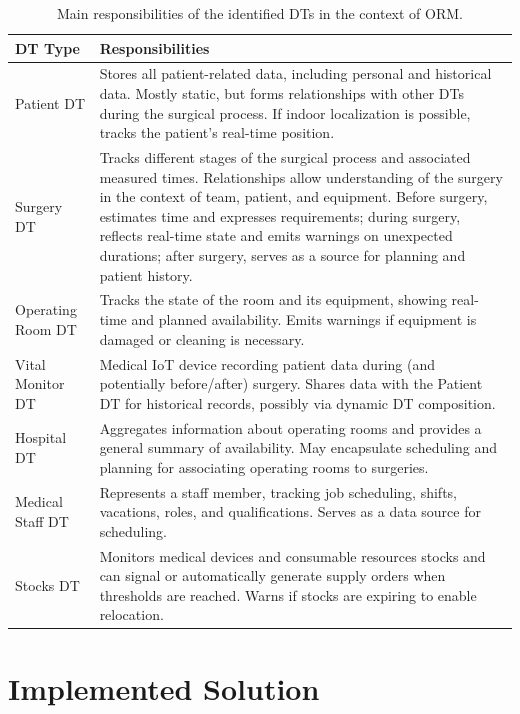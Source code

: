 \begin{table}
\centering
\small
\begin{tabularx}{\textwidth}{|p{3cm}|X|}
\hline
\textbf{DT Type} & \textbf{Responsibilities} \\
\hline
Patient DT & Stores all patient-related data, including personal and historical data. Mostly static, but forms relationships with other DTs during the surgical process. If indoor localization is possible, tracks the patient's real-time position. \\
\hline
Surgery DT & Tracks different stages of the surgical process and associated measured times. Relationships allow understanding of the surgery in the context of team, patient, and equipment. Before surgery, estimates time and expresses requirements; during surgery, reflects real-time state and emits warnings on unexpected durations; after surgery, serves as a source for planning and patient history. \\
\hline
Operating Room DT & Tracks the state of the room and its equipment, showing real-time and planned availability. Emits warnings if equipment is damaged or cleaning is necessary. \\
\hline
Vital Monitor DT & Medical IoT device recording patient data during (and potentially before/after) surgery. Shares data with the Patient DT for historical records, possibly via dynamic DT composition. \\
\hline
Hospital DT & Aggregates information about operating rooms and provides a general summary of availability. May encapsulate scheduling and planning for associating operating rooms to surgeries. \\
\hline
Medical Staff DT & Represents a staff member, tracking job scheduling, shifts, vacations, roles, and qualifications. Serves as a data source for scheduling. \\
\hline
Stocks DT & Monitors medical devices and consumable resources stocks and can signal or automatically generate supply orders when thresholds are reached. Warns if stocks are expiring to enable relocation. \\
\hline
\end{tabularx}
\caption{Main responsibilities of the identified DTs in the context of ORM.}
\label{tab:dt-responsibilities}
\end{table}


\section{Implemented Solution}

